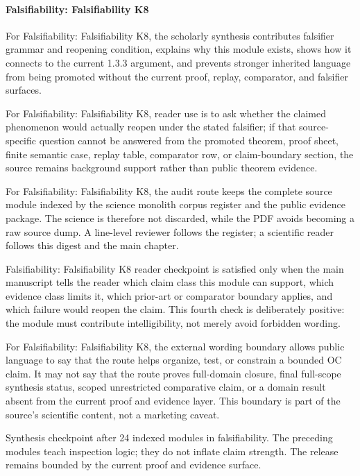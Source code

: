\paragraph{Falsifiability: Falsifiability K8}

For Falsifiability: Falsifiability K8, the scholarly synthesis contributes falsifier grammar and reopening condition, explains why this module exists, shows how it connects to the current 1.3.3 argument, and prevents stronger inherited language from being promoted without the current proof, replay, comparator, and falsifier surfaces.


For Falsifiability: Falsifiability K8, reader use is to ask whether the claimed phenomenon would actually reopen under the stated falsifier; if that source-specific question cannot be answered from the promoted theorem, proof sheet, finite semantic case, replay table, comparator row, or claim-boundary section, the source remains background support rather than public theorem evidence.


For Falsifiability: Falsifiability K8, the audit route keeps the complete source module indexed by the science monolith corpus register and the public evidence package. The science is therefore not discarded, while the PDF avoids becoming a raw source dump. A line-level reviewer follows the register; a scientific reader follows this digest and the main chapter.


Falsifiability: Falsifiability K8 reader checkpoint is satisfied only when the main manuscript tells the reader which claim class this module can support, which evidence class limits it, which prior-art or comparator boundary applies, and which failure would reopen the claim. This fourth check is deliberately positive: the module must contribute intelligibility, not merely avoid forbidden wording.


For Falsifiability: Falsifiability K8, the external wording boundary allows public language to say that the route helps organize, test, or constrain a bounded OC claim. It may not say that the route proves full-domain closure, final full-scope synthesis status, scoped unrestricted comparative claim, or a domain result absent from the current proof and evidence layer. This boundary is part of the source's scientific content, not a marketing caveat.


Synthesis checkpoint after 24 indexed modules in falsifiability. The preceding modules teach inspection logic; they do not inflate claim strength. The release remains bounded by the current proof and evidence surface.


